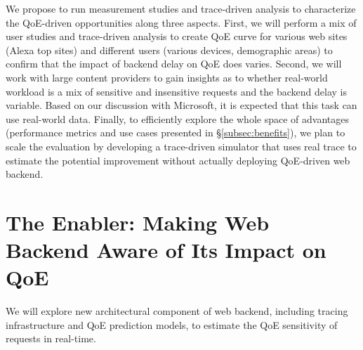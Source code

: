 We propose to run measurement studies and trace-driven analysis to characterize the QoE-driven opportunities along three aspects.
First, we will perform a mix of user studies and trace-driven analysis to create QoE curve for various web sites (\eg Alexa top sites) and different users (\eg various devices, demographic areas) to confirm that the impact of backend delay on QoE does varies.
Second, we will work with large content providers to gain insights as to whether real-world workload is a mix of sensitive and insensitive requests and the backend delay is variable. 
Based on our discussion with Microsoft, it is expected that this task can use real-world data.
Finally, to efficiently explore the whole space of advantages (performance metrics and use cases presented in \S\ref{subsec:benefits}), we plan to scale the evaluation by developing a trace-driven simulator that uses real trace to estimate the potential improvement without actually deploying QoE-driven web backend.






\section{The Enabler: Making Web Backend Aware of Its Impact on QoE}
\label{sec:enabler}
\begin{task}
We will explore new architectural component of web backend, including tracing infrastructure and QoE prediction models, to estimate the QoE sensitivity of requests in real-time.
\end{task}


